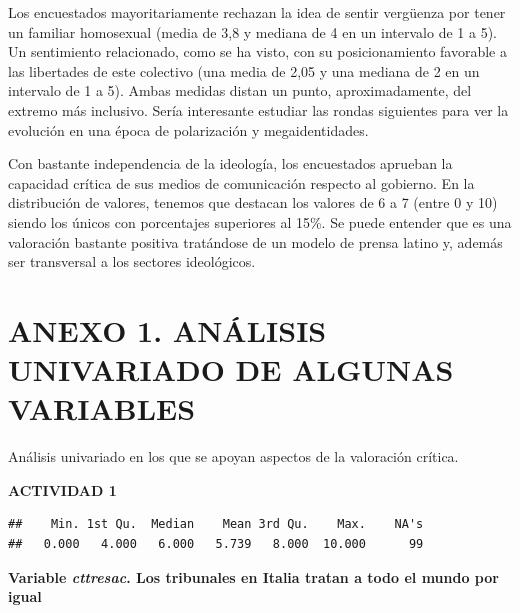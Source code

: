 \documentclass[
  12 pt,
  a4paper,
]{article}
\newenvironment{Shaded}{\begin{snugshade}}{\end{snugshade}}
\newcommand{\FunctionTok}[1]{\textcolor[rgb]{0.13,0.29,0.53}{\textbf{#1}}}
\newcommand{\NormalTok}[1]{#1}
\newcommand{\SpecialCharTok}[1]{\textcolor[rgb]{0.81,0.36,0.00}{\textbf{#1}}}
\begin{document}
Los encuestados mayoritariamente rechazan la idea de sentir vergüenza
por tener un familiar homosexual (media de 3,8 y mediana de 4 en un
intervalo de 1 a 5). Un sentimiento relacionado, como se ha visto, con
su posicionamiento favorable a las libertades de este colectivo (una
media de 2,05 y una mediana de 2 en un intervalo de 1 a 5). Ambas
medidas distan un punto, aproximadamente, del extremo más inclusivo.
Sería interesante estudiar las rondas siguientes para ver la evolución
en una época de polarización y megaidentidades.

Con bastante independencia de la ideología, los encuestados aprueban la
capacidad crítica de sus medios de comunicación respecto al gobierno. En
la distribución de valores, tenemos que destacan los valores de 6 a 7
(entre 0 y 10) siendo los únicos con porcentajes superiores al 15\%. Se
puede entender que es una valoración bastante positiva tratándose de un
modelo de prensa latino y, además ser transversal a los sectores
ideológicos.

\newpage

\section{ANEXO 1. ANÁLISIS UNIVARIADO DE ALGUNAS
VARIABLES}\label{anexo-1.-anuxe1lisis-univariado-de-algunas-variables}

Análisis univariado en los que se apoyan aspectos de la valoración
crítica.

\textbf{ACTIVIDAD 1}

\begin{Shaded}
\end{Shaded}

\begin{verbatim}
##    Min. 1st Qu.  Median    Mean 3rd Qu.    Max.    NA's 
##   0.000   4.000   6.000   5.739   8.000  10.000      99
\end{verbatim}

\textbf{Variable \emph{cttresac}. Los tribunales en Italia tratan a todo
el mundo por igual}

\begin{Shaded}
\end{Shaded}
\end{document}
